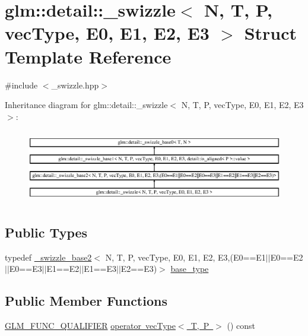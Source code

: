 \hypertarget{structglm_1_1detail_1_1__swizzle}{}\section{glm\+::detail\+::\+\_\+swizzle$<$ N, T, P, vec\+Type, E0, E1, E2, E3 $>$ Struct Template Reference}
\label{structglm_1_1detail_1_1__swizzle}


{\ttfamily \#include $<$\+\_\+swizzle.\+hpp$>$}

Inheritance diagram for glm\+::detail\+::\+\_\+swizzle$<$ N, T, P, vec\+Type, E0, E1, E2, E3 $>$\+:\begin{figure}[H]
\begin{center}
\leavevmode
\includegraphics[height=3.246377cm]{structglm_1_1detail_1_1__swizzle}
\end{center}
\end{figure}
\subsection*{Public Types}
\begin{DoxyCompactItemize}
\item 
typedef \mbox{\hyperlink{structglm_1_1detail_1_1__swizzle__base2}{\+\_\+swizzle\+\_\+base2}}$<$ N, T, P, vec\+Type, E0, E1, E2, E3,(E0==E1$\vert$$\vert$E0==E2$\vert$$\vert$E0==E3$\vert$$\vert$E1==E2$\vert$$\vert$E1==E3$\vert$$\vert$E2==E3)$>$ \mbox{\hyperlink{structglm_1_1detail_1_1__swizzle_a38e9744c2fa9929a0c847c52d1832ce6}{base\+\_\+type}}
\end{DoxyCompactItemize}
\subsection*{Public Member Functions}
\begin{DoxyCompactItemize}
\item 
\mbox{\hyperlink{setup_8hpp_a33fdea6f91c5f834105f7415e2a64407}{G\+L\+M\+\_\+\+F\+U\+N\+C\+\_\+\+Q\+U\+A\+L\+I\+F\+I\+ER}} \mbox{\hyperlink{structglm_1_1detail_1_1__swizzle_a61812f7b0b36f71a48fb45947a6a94fb}{operator vec\+Type$<$ T, P $>$}} () const
\end{DoxyCompactItemize}
